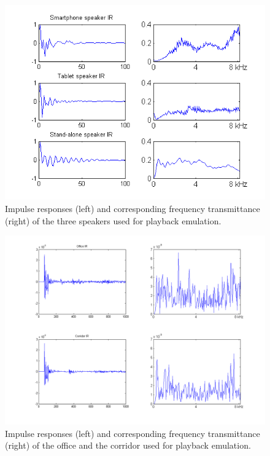 \begin{figure}
	\centering
	\includegraphics[width=1\linewidth]{Figs/IRs.png}
	\caption{Impulse responses (left) and corresponding frequency transmittance (right) of the three speakers used for playback emulation.}
	\label{fig::IRs}
\end{figure}


\begin{figure}
	\centering
	\includegraphics[width=1\linewidth]{Figs/Room_IRs.png}
	\caption{Impulse responses (left) and corresponding frequency transmittance (right) of the office and the corridor used for playback emulation.}
	\label{fig::Room_IRs}
\end{figure}



